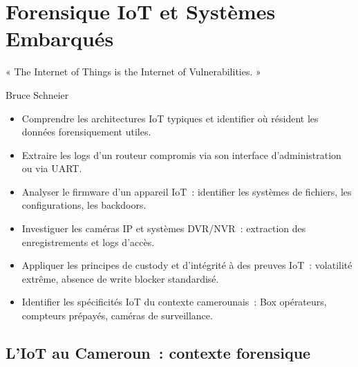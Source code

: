 
\chapter{Forensique IoT et Systèmes Embarqués}
\label{chap:for-iot}

\epigraph{%
    « The Internet of Things is the Internet of Vulnerabilities. »%
}{Bruce Schneier}


\begin{boxobjectifs}
\begin{itemize}
    \item Comprendre les architectures IoT typiques et identifier
          où résident les données forensiquement utiles.
    \item Extraire les logs d'un routeur compromis via son interface
          d'administration ou via UART.
    \item Analyser le firmware d'un appareil IoT~: identifier les
          systèmes de fichiers, les configurations, les backdoors.
    \item Investiguer les caméras IP et systèmes DVR/NVR~:
          extraction des enregistrements et logs d'accès.
    \item Appliquer les principes de custody et d'intégrité à des
          preuves IoT~: volatilité extrême, absence de write blocker
          standardisé.
    \item Identifier les spécificités IoT du contexte camerounais~:
          Box opérateurs, compteurs prépayés, caméras de surveillance.
\end{itemize}
\end{boxobjectifs}

\bigskip

\section*{L'IoT au Cameroun~: contexte forensique}

